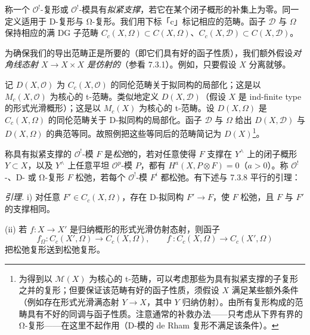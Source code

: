  称一个 $\mathcal{O}^!$-复形或 $\mathcal{O}^!$-模具有\emph{拟紧支撑}，若它在某个闭子概形的补集上为零。同一定义适用于 D-复形与 Ω-复形。我们用下标「c」标记相应的范畴。函子 $\mathcal{D}$ 与 $\Omega$ 保持相应的满 DG 子范畴 $C_c(X,\Omega)\subset C(X,\Omega)$、$C_c(X,\mathcal{D})\subset C(X,\mathcal{D})$。


为确保我们的导出范畴正是所要的（即它们具有好的函子性质），我们额外假设\emph{对角线态射 $X\to X\times X$ 是仿射的}（参看 7.3.1）。例如，只要假设 $X$ 分离就够。

记 $D(X,\mathcal{O})$ 为 $C_c(X,\mathcal{O})$ 的同伦范畴关于拟同构的局部化；这是以 $M_c(X,\mathcal{O})$ 为核心的 t-范畴。类似地定义 $D(X,\mathcal{D})$（假设 $X$ 是 ind-finite type 的形式光滑概形）；这是以 $M_c(X)$ 为核心的 t-范畴。设 $D(X,\Omega)$ 是 $C_c(X,\Omega)$ 的同伦范畴关于 D-拟同构的局部化。函子 $\mathcal{D}$ 与 $\Omega$ 给出 $D(X,\mathcal{D})$ 与 $D(X,\Omega)$ 的典范等同。故照例把这些等同后的范畴简记为 $D(X)$\footnote{为得到以 $\mathcal{M}(X)$ 为核心的 t-范畴，可以考虑那些为具有拟紧支撑的子复形之并的复形；但要保证该范畴有好的函子性质，须假设 $X$ 满足某些额外条件（例如存在形式光滑满态射 $Y\to X$，其中 $Y$ 归纳仿射）。由所有复形构成的范畴具有不好的同调与函子性质。注意通常的补救办法——只考虑从下界有界的 Ω-复形——在这里不起作用（D-模的 de Rham 复形不满足该条件）。}。

称具有拟紧支撑的 $\mathcal{O}^!$-模 $F$ 是\emph{松弛}的，若对任意使得 $F$ 支撑在 $Y^\wedge$ 上的闭子概形 $Y\subset X$，以及 $Y^\wedge$ 上任意平坦 $\mathcal{O}^p$-模 $P$，都有 $H^a(X,P\otimes F)=0$（$a>0$）。称 $\mathcal{O}^!$-、D- 或 Ω-复形 $F$ 松弛，若每个 $\mathcal{O}^!$-模 $F^i$ 都松弛。有下述与 7.3.8 平行的引理：

 \emph{引理.} i) 对任意 $F'\in C_c(X,\Omega)$，存在 D-拟同构 $F'\to F$，使 $F$ 松弛，且 $F$ 与 $F'$ 的支撑相同。

(ii) 若 $f:X\to X'$ 是归纳概形的形式光滑仿射态射，则函子
\[
f^\cdot_\Omega:C_c(X',\Omega)\to C_c(X,\Omega),\qquad f^\cdot:C_c(X,\Omega)\to C_c(X',\Omega)
\]
把松弛复形送到松弛复形。

